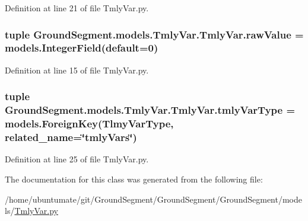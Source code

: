 Definition at line 21 of file Tmly\+Var.\+py.

\hypertarget{class_ground_segment_1_1models_1_1_tmly_var_1_1_tmly_var_a1977b5e57c94d403dc4d6c624068ef59}{}
\subsubsection[{raw\+Value}]{\setlength{\rightskip}{0pt plus 5cm}tuple Ground\+Segment.\+models.\+Tmly\+Var.\+Tmly\+Var.\+raw\+Value = models.\+Integer\+Field(default=0)\hspace{0.3cm}{\ttfamily [static]}}\label{class_ground_segment_1_1models_1_1_tmly_var_1_1_tmly_var_a1977b5e57c94d403dc4d6c624068ef59}


Definition at line 15 of file Tmly\+Var.\+py.

\hypertarget{class_ground_segment_1_1models_1_1_tmly_var_1_1_tmly_var_afeaa04d580bfeb6ff0344998329d8d23}{}
\subsubsection[{tmly\+Var\+Type}]{\setlength{\rightskip}{0pt plus 5cm}tuple Ground\+Segment.\+models.\+Tmly\+Var.\+Tmly\+Var.\+tmly\+Var\+Type = models.\+Foreign\+Key({\bf Tlmy\+Var\+Type}, related\+\_\+name=\char`\"{}tmly\+Vars\char`\"{})\hspace{0.3cm}{\ttfamily [static]}}\label{class_ground_segment_1_1models_1_1_tmly_var_1_1_tmly_var_afeaa04d580bfeb6ff0344998329d8d23}


Definition at line 25 of file Tmly\+Var.\+py.



The documentation for this class was generated from the following file\+:\begin{DoxyCompactItemize}
\item 
/home/ubuntumate/git/\+Ground\+Segment/\+Ground\+Segment/\+Ground\+Segment/models/\hyperlink{_tmly_var_8py}{Tmly\+Var.\+py}\end{DoxyCompactItemize}
